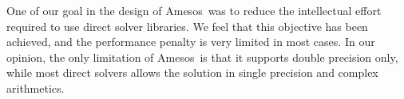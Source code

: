 \documentclass{llncs}
\newcommand{\amesos}{{\sc Amesos}}
\begin{document}
One of our goal in the design of \amesos\ was to reduce the intellectual
effort required to use direct solver libraries. We feel that this objective
has been achieved, and the performance penalty is very limited in most cases.
In our opinion, the only limitation of \amesos\ is that it supports double
precision only, while most direct solvers allows the solution in single
precision and complex arithmetics.



\end{document}
